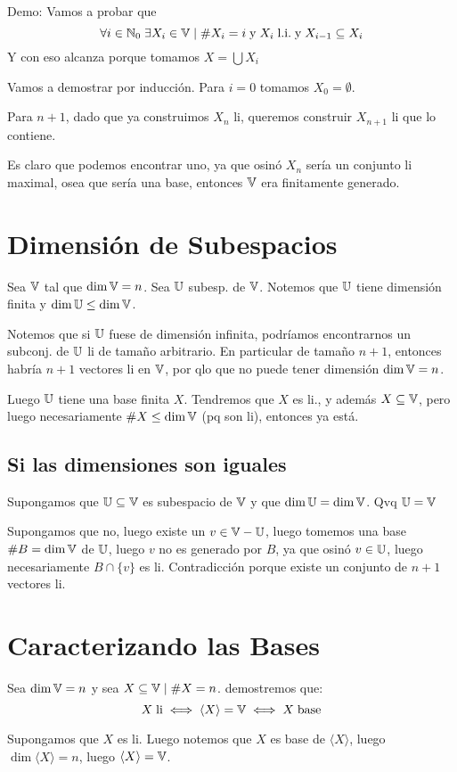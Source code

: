 \documentclass{article}
\begin{document}
Demo: Vamos a probar que
\[\forall i \in \mathbb{N}_0 \; \exists X_i \in \mathbb{V} \mid \#X_i = i  \;
\text{y} \; 
X_i \; \text{l.i.} \; \text{y} \; X_{i-1} \subseteq X_i
\]
Y con eso alcanza porque tomamos $X = \bigcup X_i$

Vamos a demostrar por inducción. Para $i = 0$ tomamos $X_0 = \emptyset$.

Para $n+1$, dado que ya construimos $X_n$ li, queremos construir $X_{n+1}$ li que lo
contiene.

Es claro que podemos encontrar uno, ya que osinó $X_n$ sería un conjunto li maximal,
osea que sería una base, entonces $\mathbb{V}$ era finitamente generado.

\section{Dimensión de Subespacios}
Sea $\mathbb{V}$ tal que $\dim \mathbb{V} = n$. Sea $\mathbb{U}$ subesp. de $\mathbb{V}$. Notemos que $\mathbb{U}$ tiene
dimensión finita y $\dim \mathbb{U} \leq \dim \mathbb{V}$.

Notemos que si $\mathbb{U}$ fuese de dimensión infinita, podríamos encontrarnos un subconj. de $\mathbb{U}$
li de tamaño arbitrario. En particular de tamaño $n+1$, entonces habría $n+1$ vectores
li en $\mathbb{V}$, por qlo que no puede tener dimensión $\dim \mathbb{V} = n$.

Luego $\mathbb{U}$ tiene una base finita $X$. Tendremos que $X$ es li., y además $X \subseteq \mathbb{V}$,
pero luego necesariamente $\# X \leq \dim \mathbb{V}$ (pq son li), entonces ya está.

\subsection{Si las dimensiones son iguales}
Supongamos que $\mathbb{U} \subseteq \mathbb{V}$ es subespacio de $\mathbb{V}$ y que $\dim \mathbb{U} = \dim \mathbb{V}$. Qvq
$\mathbb{U} = \mathbb{V}$

Supongamos que no, luego existe un $v \in \mathbb{V} - \mathbb{U}$, luego tomemos una base $\# B = \dim \mathbb{V}$
de $\mathbb{U}$, luego $v$ no es generado por $B$, ya que osinó $v \in \mathbb{U}$, luego
necesariamente $B \cap \{v\}$ es li. Contradicción porque existe un conjunto de $n+1$
vectores li.

\section{Caracterizando las Bases}
Sea $\dim \mathbb{V} = n$ y sea $X \subseteq \mathbb{V} \mid \#X = n$. demostremos que:
\[X \;\text{li} \iff \langle X \rangle = \mathbb{V} \iff X \;\text{base}\]

Supongamos que $X$ es li. Luego notemos que $X$ es base de $\langle X \rangle$, luego
$\dim \langle X \rangle = n$, luego $\langle X \rangle = \mathbb{V}$.
\end{document}
